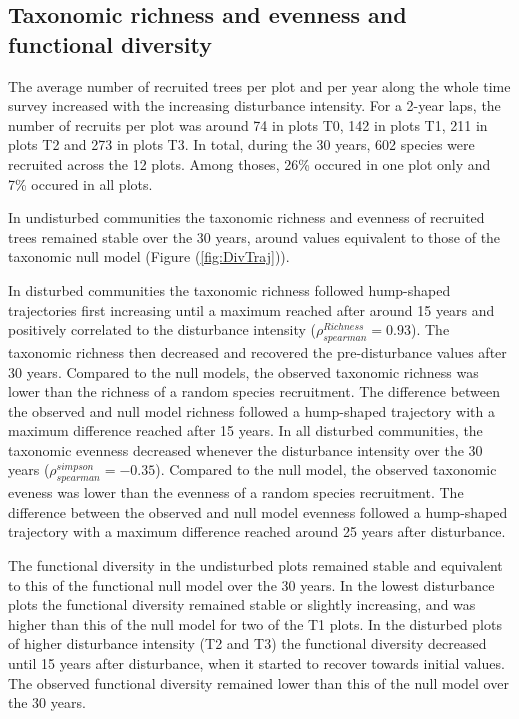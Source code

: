\documentclass[fleqn,10pt]{ArtEcoFoG} %
\begin{document}
\subsection{Taxonomic richness and evenness and functional
diversity}\label{taxonomic-richness-and-evenness-and-functional-diversity}

\color{red} The average number of recruited trees per plot and per year
along the whole time survey increased with the increasing disturbance
intensity. For a 2-year laps, the number of recruits per plot was around
74 in plots T0, 142 in plots T1, 211 in plots T2 and 273 in plots T3. In
total, during the 30 years, 602 species were recruited across the 12
plots. Among thoses, 26\% occured in one plot only and 7\% occured in
all plots. \color{black}

In undisturbed communities the taxonomic richness and evenness of
recruited trees remained stable over the 30 years, around values
equivalent to those of the taxonomic null model (Figure
(\ref{fig:DivTraj})).

In disturbed communities the taxonomic richness followed hump-shaped
trajectories first increasing until a maximum reached after around 15
years and positively correlated to the disturbance intensity
(\(\rho^{Richness}_{spearman}=0.93\)). The taxonomic richness then
decreased and recovered the pre-disturbance values after 30 years.
Compared to the null models, the observed taxonomic richness was lower
than the richness of a random species recruitment. The difference
between the observed and null model richness followed a hump-shaped
trajectory with a maximum difference reached after 15 years. In all
disturbed communities, the taxonomic evenness decreased whenever the
disturbance intensity over the 30 years
(\(\rho^{simpson}_{spearman}=-0.35\)). Compared to the null model, the
observed taxonomic eveness was lower than the evenness of a random
species recruitment. The difference between the observed and null model
evenness followed a hump-shaped trajectory with a maximum difference
reached around 25 years after disturbance.

The functional diversity in the undisturbed plots remained stable and
equivalent to this of the functional null model over the 30 years. In
the lowest disturbance plots the functional diversity remained stable or
slightly increasing, and was higher than this of the null model for two
of the T1 plots. In the disturbed plots of higher disturbance intensity
(T2 and T3) the functional diversity decreased until 15 years after
disturbance, when it started to recover towards initial values. The
observed functional diversity remained lower than this of the null model
over the 30 years.
\end{document}
